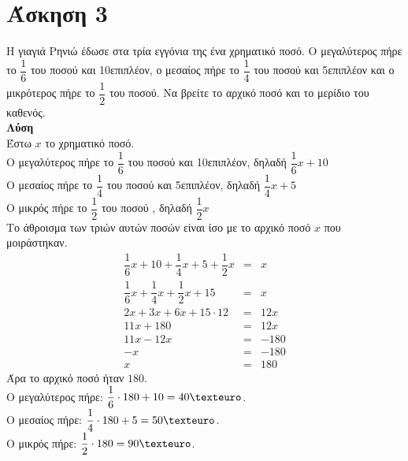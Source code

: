 \documentclass[a4paper,10pt]{report}
\begin{document}
\section*{Άσκηση 3  \hfill \small{}}
Η γιαγιά Ρηνιώ έδωσε στα τρία εγγόνια της ένα χρηματικό ποσό. Ο μεγαλύτερος πήρε το $\dfrac{1}{6}$ του ποσού 
και 10\texteuro \quad επιπλέον,  ο μεσαίος πήρε το $\dfrac{1}{4}$ του ποσού και 5\texteuro \quad επιπλέον και ο 
μικρότερος πήρε το $\dfrac{1}{2}$ του ποσού. Να βρείτε το αρχικό ποσό και το μερίδιο του καθενός.\\
\textbf{Λύση}\\
Έστω $x$ το χρηματικό ποσό.\\
Ο μεγαλύτερος πήρε το $\dfrac{1}{6}$ του ποσού και 10\texteuro \quad επιπλέον, δηλαδή $\dfrac{1}{6}x+10$\\
Ο μεσαίος πήρε το $\dfrac{1}{4}$ του ποσού και 5\texteuro \quad επιπλέον, δηλαδή $\dfrac{1}{4}x+5$\\
Ο μικρός πήρε το $\dfrac{1}{2}$ του ποσού , δηλαδή $\dfrac{1}{2}x$\\
Το άθροισμα των τριών αυτών ποσών είναι ίσο με το αρχικό ποσό $x$ που μοιράστηκαν. \\
\begin{eqnarray*}
  \dfrac{1}{6}x+10 +\dfrac{1}{4}x +5 +\dfrac{1}{2}x  &=&  x\\
  \dfrac{1}{6}x+\dfrac{1}{4}x+\dfrac{1}{2}x +15      &=&  x\\
  2x+3x+6x+15\cdot 12    &=&  12x\\
   11x+180    &=&  12x\\
  11x-12x     &=& -180\\
  -x          &=& -180\\
    x         &=&  180
\end{eqnarray*}
Άρα το αρχικό ποσό ήταν $180$.\\
Ο μεγαλύτερος πήρε: $\dfrac{1}{6}\cdot 180+10=40\texteuro$.\\
Ο μεσαίος πήρε: $\dfrac{1}{4}\cdot 180+5=50\texteuro$.\\
Ο μικρός πήρε: $\dfrac{1}{2}\cdot 180=90\texteuro$.\\
\end{document}

